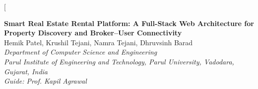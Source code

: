 \documentclass[10pt,twocolumn]{article}
\begin{document}
\twocolumn[
\begin{center}
{\LARGE\bfseries Smart Real Estate Rental Platform: A Full-Stack Web Architecture for Property Discovery and Broker--User Connectivity}\\
\vspace{10pt}
{\large Hemik Patel, Krushil Tejani, Namra Tejani, Dhruvsinh Barad}\\
\vspace{4pt}
{\itshape Department of Computer Science and Engineering}\\
{\itshape Parul Institute of Engineering and Technology, Parul University, Vadodara, Gujarat, India}\\
\vspace{2pt}
{\itshape Guide: Prof. Kapil Agrawal}\\
\vspace{10pt}
\end{center}
\end{document}

